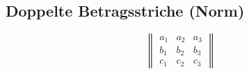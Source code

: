 \subsection{Doppelte Betragsstriche (Norm)}
\begin{equation}
	\begin{Vmatrix} a_1 & a_2 & a_3\\ b_1 & b_2 & b_3 \\ c_1 & c_2 & c_3 \end{Vmatrix}
\end{equation}
